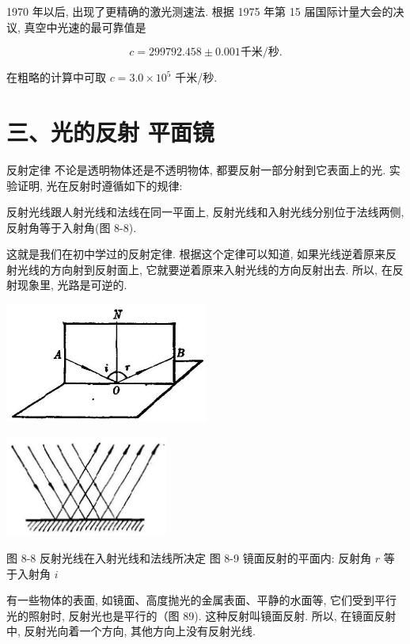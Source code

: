 \documentclass[10pt]{article}
\begin{document}
1970 年以后, 出现了更精确的激光测速法. 根据 1975 年第 15 届国际计量大会的决议, 真空中光速的最可靠值是

\[
c = {299792.458} \pm {0.001}\text{千米/秒.}
\]

在粗略的计算中可取 \(c = {3.0} \times {10}^{5}\) 千米/秒.

\section*{三、光的反射 平面镜}

反射定律 不论是透明物体还是不透明物体, 都要反射一部分射到它表面上的光. 实验证明, 光在反射时遵循如下的规律:

反射光线跟人射光线和法线在同一平面上, 反射光线和入射光线分别位于法线两侧, 反射角等于入射角(图 8-8).

这就是我们在初中学过的反射定律. 根据这个定律可以知道, 如果光线逆着原来反射光线的方向射到反射面上, 它就要逆着原来入射光线的方向反射出去. 所以, 在反射现象里, 光路是可逆的.

\begin{center}
\includegraphics[max width=0.5\textwidth]{images/01913056-1f15-74d8-9184-9aab52c9d66b_250_939520.jpg}
\end{center}

\begin{center}
\includegraphics[max width=0.4\textwidth]{images/01913056-1f15-74d8-9184-9aab52c9d66b_250_727691.jpg}
\end{center}

图 8-8 反射光线在入射光线和法线所决定 图 8-9 镜面反射的平面内: 反射角 \(r\) 等于入射角 \(i\)

有一些物体的表面, 如镜面、高度抛光的金属表面、平静的水面等, 它们受到平行光的照射时, 反射光也是平行的（图 89). 这种反射叫镜面反射. 所以, 在镜面反射中, 反射光向着一个方向, 其他方向上没有反射光线.
\end{document}
